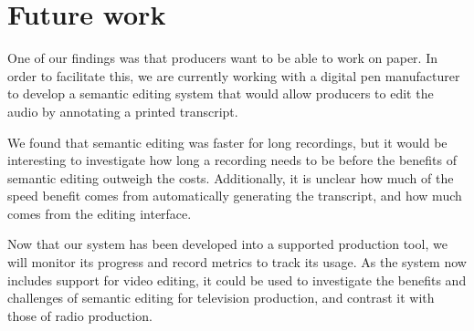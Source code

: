 \section{Future work}
One of our findings was that producers want to be able to work on paper. In order to facilitate this, we are currently
working with a digital pen manufacturer to develop a semantic editing system that would allow producers to edit the
audio by annotating a printed transcript. 


We found that semantic editing was faster for long recordings, but it would be interesting to investigate how long a
recording needs to be before the benefits of semantic editing outweigh the costs. Additionally, it is unclear how much
of the speed benefit comes from automatically generating the transcript, and how much comes from the editing interface.



Now that our system has been developed into a supported production tool, we will monitor its progress and record
metrics to track its usage. As the system now includes support for video editing, it could be used to investigate the
benefits and challenges of semantic editing for television production, and contrast it with those of radio production.



